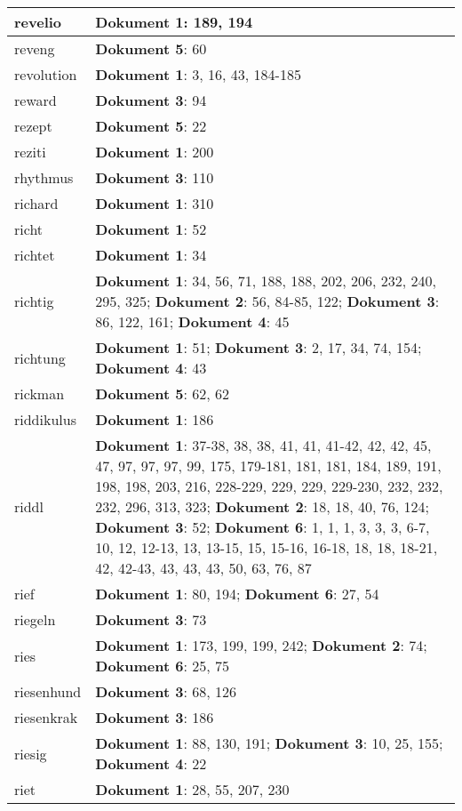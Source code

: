 \documentclass[a5paper]{article}
\begin{document}
\begin{longtable}[l]{|l|p{3in}|}
\hline
revelio & \textbf{Dokument 1}: 189, 194 \\
\hline
reveng & \textbf{Dokument 5}: 60 \\
\hline
revolution & \textbf{Dokument 1}: 3, 16, 43, 184-185 \\
\hline
reward & \textbf{Dokument 3}: 94 \\
\hline
rezept & \textbf{Dokument 5}: 22 \\
\hline
reziti & \textbf{Dokument 1}: 200 \\
\hline
rhythmus & \textbf{Dokument 3}: 110 \\
\hline
richard & \textbf{Dokument 1}: 310 \\
\hline
richt & \textbf{Dokument 1}: 52 \\
\hline
richtet & \textbf{Dokument 1}: 34 \\
\hline
richtig & \textbf{Dokument 1}: 34, 56, 71, 188, 188, 202, 206, 232, 240, 295, 325; \textbf{Dokument 2}: 56, 84-85, 122; \textbf{Dokument 3}: 86, 122, 161; \textbf{Dokument 4}: 45 \\
\hline
richtung & \textbf{Dokument 1}: 51; \textbf{Dokument 3}: 2, 17, 34, 74, 154; \textbf{Dokument 4}: 43 \\
\hline
rickman & \textbf{Dokument 5}: 62, 62 \\
\hline
riddikulus & \textbf{Dokument 1}: 186 \\
\hline
riddl & \textbf{Dokument 1}: 37-38, 38, 38, 41, 41, 41-42, 42, 42, 45, 47, 97, 97, 97, 99, 175, 179-181, 181, 181, 184, 189, 191, 198, 198, 203, 216, 228-229, 229, 229, 229-230, 232, 232, 232, 296, 313, 323; \textbf{Dokument 2}: 18, 18, 40, 76, 124; \textbf{Dokument 3}: 52; \textbf{Dokument 6}: 1, 1, 1, 3, 3, 3, 6-7, 10, 12, 12-13, 13, 13-15, 15, 15-16, 16-18, 18, 18, 18-21, 42, 42-43, 43, 43, 43, 50, 63, 76, 87 \\
\hline
rief & \textbf{Dokument 1}: 80, 194; \textbf{Dokument 6}: 27, 54 \\
\hline
riegeln & \textbf{Dokument 3}: 73 \\
\hline
ries & \textbf{Dokument 1}: 173, 199, 199, 242; \textbf{Dokument 2}: 74; \textbf{Dokument 6}: 25, 75 \\
\hline
riesenhund & \textbf{Dokument 3}: 68, 126 \\
\hline
riesenkrak & \textbf{Dokument 3}: 186 \\
\hline
riesig & \textbf{Dokument 1}: 88, 130, 191; \textbf{Dokument 3}: 10, 25, 155; \textbf{Dokument 4}: 22 \\
\hline
riet & \textbf{Dokument 1}: 28, 55, 207, 230 \\

\end{longtable}
\end{document}
